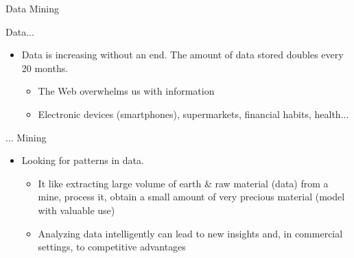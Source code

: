 \documentclass{beamer}
\begin{document}
\begin{frame}{Data Mining}


\begin{block}{Data...}
\begin{itemize}
 \item \alert{Data} is increasing without an end. The amount of data stored doubles every 20 months.
    \begin{itemize}
      \item The Web overwhelms us with information
      \item Electronic devices (smartphones), supermarkets, financial habits, health... 
    \end{itemize}
\end{itemize}
\end{block}
\vspace{-2mm}
\begin{block}{... Mining}
\begin{itemize}
 \item Looking for patterns in data.
    \begin{itemize}
      \item It like extracting large volume of earth \& raw material (data) from a mine, process
it, obtain a small amount of very precious material (model with valuable use)
      \item Analyzing data intelligently can lead to new insights and, in commercial settings, to competitive advantages
    \end{itemize}
\end{itemize}
\end{block}

\end{frame}



% 
% 
\end{document}
